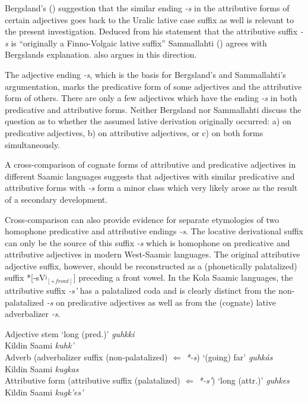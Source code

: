 {Bergsland's (\citeyear[96]{bergsland1946}) suggestion that the similar ending \textit{-s} in the attributive forms of certain adjectives goes back to the Uralic lative case suffix as well is relevant to the present investigation. Deduced from his statement that the attributive suffix \textit{-s} is “originally a Finno-Volgaic lative suffix” Sammallahti (\citeyear[71]{sammallahti1998b}) agrees with Bergslands explanation. \cite{judakin1997} also argues in this direction.

The adjective ending \textit{-s}, which is the basis for Bergsland's and Sammallahti's argumentation, marks the predicative form of some adjectives and the attributive form of others. There are only a few adjectives which have the ending \textit{-s} in both predicative and attributive forms. Neither Bergsland nor Sammallahti discuss the question as to whether the assumed lative derivation originally occurred: a) on predicative adjectives, b) on attributive adjectives, or c) on both forms simultaneously.
 
A cross-comparison of cognate forms of attributive and predicative adjectives in different Saamic languages suggests that adjectives with similar predicative and attributive forms with \textit{-s} form a minor class which very likely arose as the result of a secondary development.

Cross-comparison can also provide evidence for separate etymologies of two homophone predicative and attributive endings \textit{-s}. The locative derivational suffix can only be the source of this suffix \textit{-s} which is homophone on predicative and attributive adjectives in modern West-Saamic languages. The original attributive adjective suffix, however, should be reconstructed as a (phonetically palatalized) suffix *[-sVʲ$_{[+front]}$] preceding a front vowel. In the Kola Saamic languages, the attributive suffix \textit{-s'} has a palatalized coda and is clearly distinct from the non-palatalized \textit{-s} on predicative adjectives as well as from the (cognate) lative adverbalizer \textit{-s}.
\newpage
\begin{exe}
\ex 
\begin{xlist}
\ex	Adjective stem ‘long (pred.)’
 \textit{guhkki}\\
	{Kildin Saami} \textit{kuhk'}\\
\ex 	Adverb (adverbalizer suffix (non-palatalized) $\Leftarrow$ \textit{*-s}) ‘(going) far’
 \textit{guhkás}\\
	{Kildin Saami} \textit{kugkas}\\
\ex 	Attributive form (attributive suffix (palatalized) $\Leftarrow$ \textit{*-s'}) ‘long (attr.)’
 \textit{guhkes}\\
	{Kildin Saami} \textit{kugk'es'}\\
\end{xlist} 	
\end{exe}

}
